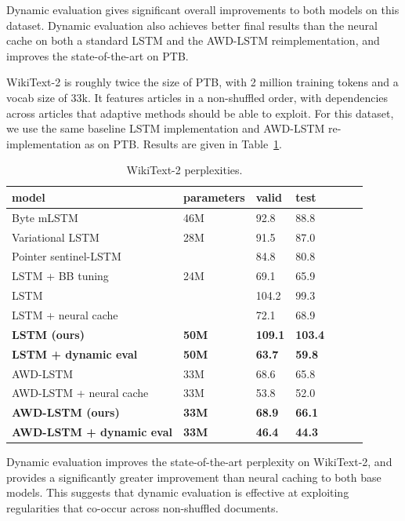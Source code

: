 \documentclass{article}
\begin{document}
Dynamic evaluation gives significant overall improvements to both models on this dataset. Dynamic evaluation also achieves better final results than the neural cache on both a standard LSTM and the AWD-LSTM reimplementation, and improves the state-of-the-art on PTB\@. 

WikiText-2 is roughly twice the size of PTB, with 2 million training tokens and a vocab size of 33k. It features articles in a non-shuffled order, with dependencies across articles that adaptive methods should be able to exploit. For this dataset, we use the same baseline LSTM implementation and AWD-LSTM re-implementation as on PTB\@. Results are given in Table~\ref{tab:wikitext}.

\begin{table}[tb]
\begin{center} 
\begin{tabular}{  l  l  l  l  l  l  l } \toprule 
model &  parameters & valid & test  \\ 
\midrule 
Byte mLSTM \citep{krause2016} & 46M &92.8 & 88.8 \\
Variational LSTM \citep{inan2017} & 28M &91.5 & 87.0 \\
Pointer sentinel-LSTM \citep{Merity2016} & & 84.8 & 80.8 \\
LSTM + BB tuning \citep{melis2017}& 24M & 69.1 & 65.9 \\
\midrule 
LSTM   \citep{grave2017} & & 104.2 & 99.3 \\
LSTM + neural cache \citep{grave2017}& & 72.1 & 68.9 \\
\textbf{LSTM (ours)} &\textbf{50M} & \textbf{109.1} & \textbf{103.4}  \\
\textbf{LSTM + dynamic eval}&\textbf{50M}  &  \textbf{63.7} & \textbf{59.8}\\
\midrule 
AWD-LSTM  \citep{merity2017}& 33M  & 68.6 & 65.8 \\
AWD-LSTM  + neural cache \citep{merity2017}& 33M & 53.8 & 52.0 \\
\textbf{AWD-LSTM (ours)}& \textbf{33M} & \textbf{68.9} &  \textbf{66.1} \\
\textbf{AWD-LSTM + dynamic eval}& \textbf{33M}  & \textbf{46.4} & \textbf{44.3} \\
\bottomrule
\end{tabular} 
\end{center}
\caption{WikiText-2 perplexities.}
\label{tab:wikitext}
\end{table}

Dynamic evaluation improves the state-of-the-art perplexity on WikiText-2, and provides a significantly greater improvement than neural caching to both base models. This suggests that dynamic evaluation is effective at exploiting regularities that co-occur across non-shuffled documents.
\end{document}
